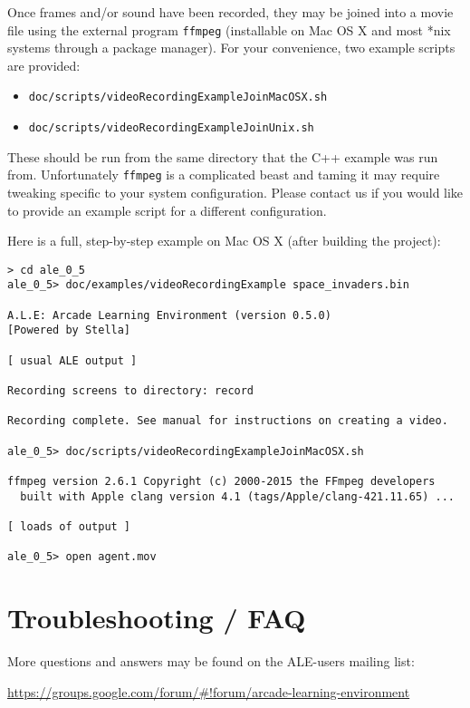 \documentclass[12pt]{article}
\begin{document}
Once frames and/or sound have been recorded, they may be joined into a movie file using the external program \texttt{ffmpeg} (installable on Mac OS X and most *nix systems through a package manager). For your convenience, two example scripts are provided:

\begin{itemize}
    \item{\texttt{doc/scripts/videoRecordingExampleJoinMacOSX.sh}}
    \item{\texttt{doc/scripts/videoRecordingExampleJoinUnix.sh}}
\end{itemize}

These should be run from the same directory that the C++ example was run from. Unfortunately \texttt{ffmpeg} is a complicated beast and taming it may require tweaking specific to your system configuration. Please contact us if you would like to provide an example script for a different configuration.

Here is a full, step-by-step example on Mac OS X (after building the project):
\begin{verbatim}
> cd ale_0_5
ale_0_5> doc/examples/videoRecordingExample space_invaders.bin

A.L.E: Arcade Learning Environment (version 0.5.0)
[Powered by Stella]

[ usual ALE output ]

Recording screens to directory: record

Recording complete. See manual for instructions on creating a video.

ale_0_5> doc/scripts/videoRecordingExampleJoinMacOSX.sh

ffmpeg version 2.6.1 Copyright (c) 2000-2015 the FFmpeg developers
  built with Apple clang version 4.1 (tags/Apple/clang-421.11.65) ... 

[ loads of output ]

ale_0_5> open agent.mov
\end{verbatim}

\section{Troubleshooting / FAQ} \label{sec:troubleshooting}

More questions and answers may be found on the ALE-users mailing list:
\begin{center}
\url{https://groups.google.com/forum/#!forum/arcade-learning-environment}
\end{center}
\end{document}

